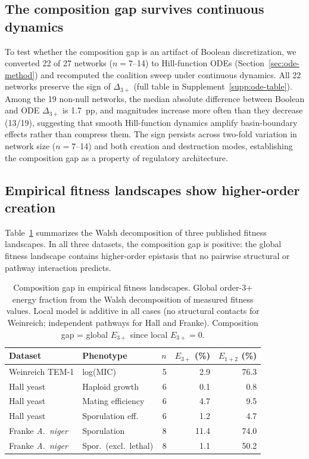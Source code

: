 \documentclass[10pt]{article}
\begin{document}
\subsection{The composition gap survives continuous dynamics}
\label{sec:ode-results}

To test whether the composition gap is an artifact of Boolean
discretization, we converted 22 of 27 networks ($n = 7$--14) to
Hill-function ODEs (Section~\ref{sec:ode-method}) and recomputed
the coalition sweep under continuous dynamics. All 22 networks
preserve the sign of $\Delta_{3+}$ (full table in
Supplement~\ref{supp:ode-table}). Among the 19 non-null networks,
the median absolute difference between Boolean and ODE
$\Delta_{3+}$ is 1.7~pp, and magnitudes increase more
often than they decrease (13/19), suggesting that smooth Hill-function
dynamics amplify basin-boundary effects rather than compress them.
The sign persists across two-fold variation in network size
($n = 7$--14) and both creation and destruction modes, establishing
the composition gap as a property of regulatory architecture.


\subsection{Empirical fitness landscapes show higher-order creation}
\label{sec:empirical-results}

Table~\ref{tab:empirical} summarizes the Walsh decomposition of three
published fitness landscapes. In all three datasets, the composition
gap is positive: the global fitness landscape contains higher-order
epistasis that no pairwise structural or pathway interaction
predicts.

\begin{table}[t]
\centering
\caption{Composition gap in empirical fitness landscapes. Global
order-3+ energy fraction from the Walsh decomposition of measured
fitness values. Local model is additive in all cases (no structural
contacts for Weinreich; independent pathways for Hall and Franke).
Composition gap = global $E_{3+}$ since local $E_{3+} = 0$.}
\label{tab:empirical}
\begin{tabular}{llrrr}
\toprule
Dataset & Phenotype & $n$ & $E_{3+}$ (\%) & $E_{1+2}$ (\%) \\
\midrule
Weinreich TEM-1 & log(MIC) & 5 & 2.9 & 76.3 \\
Hall yeast & Haploid growth & 6 & 0.1 & 0.8 \\
Hall yeast & Mating efficiency & 6 & 4.7 & 9.5 \\
Hall yeast & Sporulation eff. & 6 & 1.2 & 4.7 \\
Franke \emph{A.~niger} & Sporulation & 8 & 11.4 & 74.0 \\
Franke \emph{A.~niger} & Spor.\ (excl.\ lethal) & 8 & 1.1 & 50.2 \\
\bottomrule
\end{tabular}
\end{table}
\end{document}

